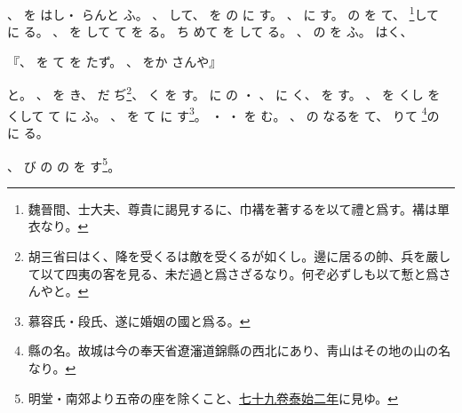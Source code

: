 \documentclass[a4paper,12pt]{article}
\begin{document}
、%
を%
はし・%
らんと%
ふ。%
、%
して、%
を%
の%
に%
す。%
、%
に%
す。%
の%
を%
て、%
\footnote{魏晉間、士大夫、尊貴に謁見するに、巾褠を著するを以て禮と爲す。褠は單衣なり。}して%
に%
る。%
、%
を%
して%
て%
を%
る。%
%
ち%
めて%
を%
して%
る。%
、%
の%
を%
ふ。%
%
はく、%
\begin{quoting}
『、%
を%
て%
を%
たず。%
、%
をか%
さんや』%
\end{quoting}
と。%
、%
を%
き、%
だ%
ぢ\footnote{胡三省曰はく、降を受くるは敵を受くるが如くし。邊に居るの帥、兵を嚴して以て四夷の客を見る、未だ過と爲さざるなり。何ぞ必ずしも以て慙と爲さんやと。}、%
く%
を%
す。%
に%
の%
・%
、%
に%
く、%
%
を%
す。%
、%
を%
くし%
を%
くして%
て%
に%
ふ。%
%
%
、%
を%
て%
に%
す\footnote{慕容氏・段氏、遂に婚姻の國と爲る。}。%
・%
・%
を%
む。%
、%
の%
なるを%
て、%
りて%
\hypertarget{tokanoseizan}{%
\footnote{縣の名。故城は今の奉天省遼瀋道錦縣の西北にあり、靑山はその地の山の名なり。}の%
に%
る}。%

%
%
、%
%
び%
の%
の%
を%
す\footnote{明堂・南郊より五帝の座を除くこと、\href{http://dl.ndl.go.jp/info:ndljp/pid/1239900/101}{七十九卷泰始二年}に見ゆ。}。%
\end{document}

